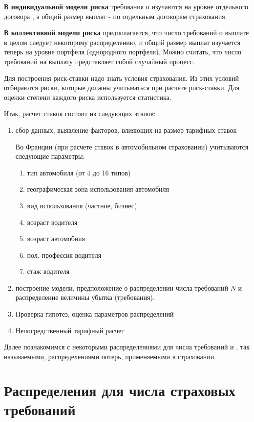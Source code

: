 \textbf{В индивидуальной модели риска } требования о изучаются на уровне отдельного договора , а общий размер выплат - по отдельным договорам страхования.

\textbf{В коллективной модели риска} предполагается, что число требований о выплате в целом следует некоторому распределению, и общий размер выплат изучается теперь на уровне портфеля (однородного портфеля). Можно считать, что число требований на выплату представляет собой случайный процесс.


Для построения риск-ставки надо знать условия страхования. Из этих условий отбираются риски, которые должны учитываться при расчете риск-ставки. Для оценки степени каждого риска используется статистика.

Итак, расчет ставок состоит из следующих этапов:
\begin{enumerate}
	\item сбор данных, выявление факторов, влияющих на размер тарифных ставок
	\begin{remark}
		Во Франции (при расчете ставок в автомобильном страховании) учитываются следующие параметры:
		\begin{enumerate}
			\item тип автомобиля (от 4 до 16 типов)
			\item географическая зона использования автомобиля 
			\item вид использования (частное, бизнес)
			\item возраст водителя 
			\item возраст автомобиля
			\item пол, профессия водителя
			\item стаж водителя
		\end{enumerate}
	\end{remark}
	\item построение модели, предположение о распределении числа требований $N$ и распределение величины убытка (требования).	
	\item Проверка гипотез, оценка параметров распределений
	\item Непосредственный тарифный расчет
\end{enumerate}

Далее познакомимся с некоторыми распределениями для числа требований и , так называемыми, распределениями потерь, применяемыми в страховании.

\section{Распределения для числа страховых требований} %

